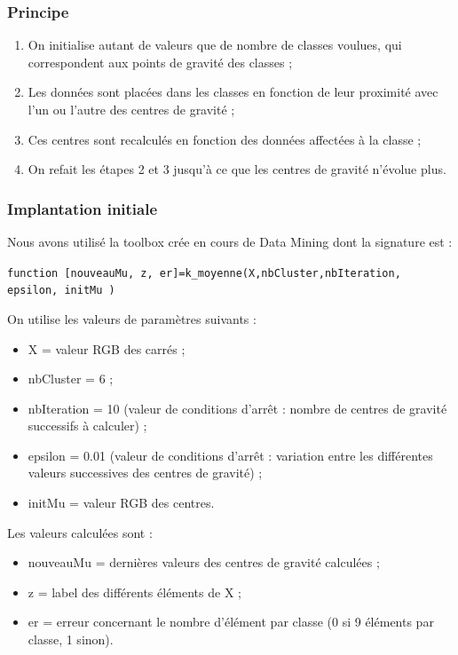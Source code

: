 \subsubsection{Principe}

  \begin{enumerate}
    \item On initialise autant de valeurs que de nombre de classes voulues, qui correspondent aux points de gravité des classes ;
    \item Les données sont placées dans les classes en fonction de leur proximité avec l'un ou l'autre des centres de gravité ; 
    \item Ces centres sont recalculés en fonction des données affectées à la classe ; 
    \item On refait les étapes 2 et 3 jusqu'à ce que les centres de gravité n'évolue plus. 
  \end{enumerate}

\subsubsection{Implantation initiale}

  Nous avons utilisé la toolbox crée en cours de Data Mining dont la signature est : 

  \verb|function [nouveauMu, z, er]=k_moyenne(X,nbCluster,nbIteration, epsilon, initMu )|

  On utilise les valeurs de paramètres suivants : 
  \begin{itemize}
    \item X = valeur RGB des carrés ;
    \item nbCluster  = 6 ; 
    \item nbIteration = 10 (valeur de conditions d'arrêt : nombre de centres de gravité successifs à calculer) ; 
    \item epsilon = 0.01 (valeur de conditions d'arrêt : variation entre les différentes valeurs successives des centres de gravité) ; 
    \item initMu = valeur RGB des centres. 
  \end{itemize}

Les valeurs calculées sont : 
  \begin{itemize}
    \item nouveauMu = dernières valeurs des centres de gravité calculées ; 
    \item z = label des différents éléments de X ; 
    \item er = erreur concernant le nombre d'élément par classe (0 si 9 éléments par classe, 1 sinon). 
  \end{itemize}

